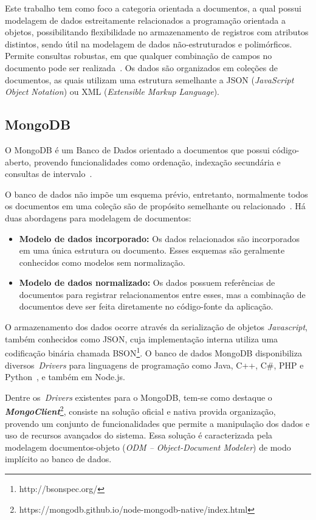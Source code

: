 \documentclass[12pt]{article}
\begin{document}
Este trabalho tem como foco a categoria orientada a documentos, a qual possui modelagem de dados estreitamente relacionados a programação orientada a objetos, possibilitando flexibilidade no armazenamento de registros com atributos distintos, sendo útil na modelagem de dados não-estruturados e polimórficos. Permite consultas robustas, em que qualquer combinação de campos no documento pode ser realizada~\cite{patil:2017}. Os dados são organizados em coleções de documentos, as quais utilizam uma estrutura semelhante a JSON (\emph{JavaScript Object Notation}) ou XML (\emph{Extensible Markup Language}).

\subsection{MongoDB}

O MongoDB é um Banco de Dados orientado a documentos que possui código-aberto, provendo funcionalidades como ordenação, indexação secundária e consultas de intervalo~\cite{membrey2011definitive}.
 
O banco de dados não impõe um esquema prévio, entretanto, normalmente todos os documentos em uma coleção são de propósito semelhante ou relacionado~\cite{kanade2014study,lutu2015big}. Há duas abordagens para modelagem de documentos:

\begin{itemize}
\item \textbf{Modelo de dados incorporado:} Os dados relacionados são incorporados em uma única estrutura ou documento. Esses esquemas são geralmente conhecidos como modelos sem normalização. %
\item \textbf{Modelo de dados normalizado:} Os dados possuem referências de documentos para registrar relacionamentos entre esses, mas a combinação de documentos deve ser feita diretamente no código-fonte da aplicação. %
\end{itemize}

O armazenamento dos dados ocorre através da serialização de objetos \textit{Javascript}, também conhecidos como JSON, cuja implementação interna utiliza uma codificação binária chamada BSON\footnote{http://bsonspec.org/}. O banco de dados MongoDB disponibiliza diversos~\emph{Drivers} para linguagens de programação como Java, C++, C\#, PHP e Python~\cite{lutu2015big}, e também em Node.js.

Dentre os~\emph{Drivers} existentes para o MongoDB, tem-se como destaque o \textbf{\textit{MongoClient}}\footnote{https://mongodb.github.io/node-mongodb-native/index.html}, consiste na solução oficial e nativa provida organização, provendo um conjunto de funcionalidades que permite a manipulação dos dados e uso de recursos avançados do sistema. Essa solução é caracterizada pela modelagem documentos-objeto (\emph{ODM -- Object-Document Modeler}) de modo implícito ao banco de dados.
\end{document}
